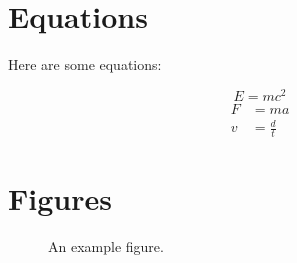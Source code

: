\documentclass{article}
\begin{document}
\begin{multicols}{2}
	\section{Equations}
	Here are some equations:

	\begin{equation}
		E = mc^2
	\end{equation}
	\begin{align}
		F & = ma          \\
		v & = \frac{d}{t}
	\end{align}

	\section{Figures}
	\begin{figure}[h]
		\centering
		\caption{An example figure.}
		\label{fig:example}
	\end{figure}

\end{multicols}
\end{document}
